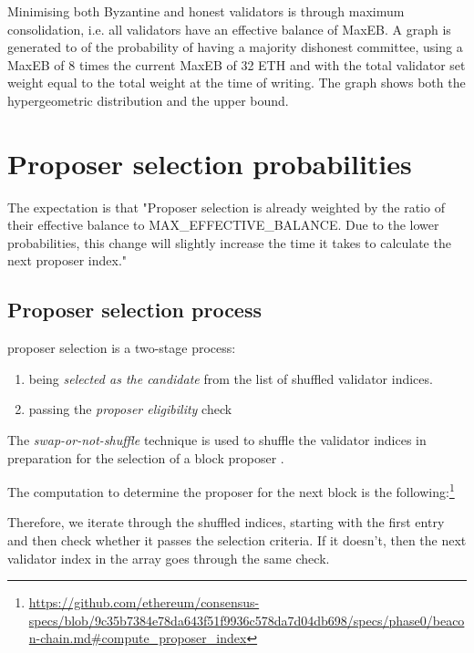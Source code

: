 \documentclass{article}
\begin{document}
Minimising both Byzantine and honest validators is through maximum
consolidation, i.e. all validators have an effective balance of MaxEB. A graph
is generated to of the probability of having a majority dishonest committee,
using a MaxEB of 8 times the current MaxEB of 32 ETH and with the total
validator set weight equal to the total weight at the time of writing. The
graph shows both the hypergeometric distribution and the upper bound.

\section{Proposer selection probabilities}
The expectation is that "Proposer selection is already weighted by the ratio of
their effective balance to MAX\_EFFECTIVE\_BALANCE. Due to the lower
probabilities, this change will slightly increase the time it takes to
calculate the next proposer index."

\subsection{Proposer selection process}

proposer selection is a two-stage process:
\begin{enumerate}
  \item being \emph{selected as the candidate} from the list of shuffled
    validator indices.
  \item passing the \emph{proposer eligibility} check
\end{enumerate}

The \emph{swap-or-not-shuffle} technique is used to shuffle the validator
indices in preparation for the selection of a block proposer
\cite{compute-shuffled-index}.

The computation to determine the proposer for the next block is the
following:\footnote{\url{https://github.com/ethereum/consensus-specs/blob/9c35b7384e78da643f51f9936c578da7d04db698/specs/phase0/beacon-chain.md#compute_proposer_index}}


Therefore, we iterate through the shuffled indices, starting with the first
entry and then check whether it passes the selection criteria. If it doesn’t,
then the next validator index in the array goes through the same check.
\end{document}
